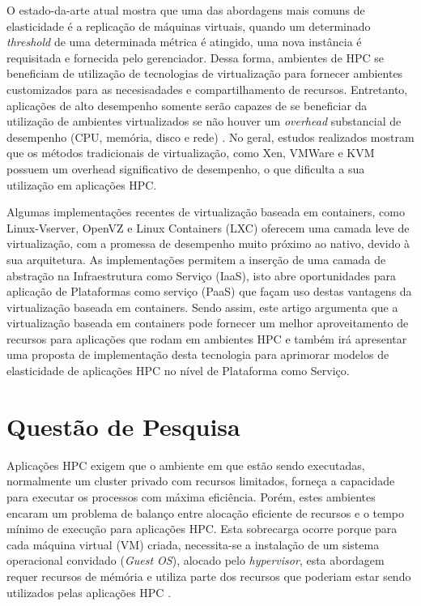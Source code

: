\documentclass[twoside,english,brazilian]{UNISINOSmonografia}
\begin{document}
O estado-da-arte atual mostra que uma das abordagens mais comuns de elasticidade é a replicação de máquinas virtuais, quando um determinado \textit{threshold} de uma determinada métrica é atingido, uma nova instância é requisitada e fornecida pelo gerenciador. Dessa forma, ambientes de HPC se beneficiam de utilização de tecnologias de virtualização para fornecer ambientes customizados para as necesisadades e compartilhamento de recursos. Entretanto, aplicações de alto desempenho somente serão capazes de se beneficiar da utilização de ambientes virtualizados se não houver um \textit{overhead} substancial de desempenho (CPU, memória, disco e rede) \cite{Xavier2013}. No geral, estudos realizados mostram que os métodos tradicionais de virtualização, como Xen, VMWare e KVM possuem um overhead significativo de desempenho, o que dificulta a sua utilização em aplicações HPC. 

Algumas implementações recentes de virtualização baseada em containers, como Linux-Vserver, OpenVZ e Linux Containers (LXC) oferecem uma camada leve de virtualização, com a promessa de desempenho muito próximo ao nativo, devido à sua arquitetura. As implementações permitem a inserção de uma camada de abstração na Infraestrutura como Serviço (IaaS), isto abre oportunidades para aplicação de Plataformas como serviço (PaaS) que façam uso destas vantagens da virtualização baseada em containers. Sendo assim, este artigo argumenta que a virtualização baseada em containers pode fornecer um melhor aproveitamento de recursos para aplicações que rodam em ambientes HPC e também irá apresentar uma proposta de implementação desta tecnologia para aprimorar modelos de elasticidade de aplicações HPC no nível de Plataforma como Serviço.



\section{Questão de Pesquisa}

Aplicações HPC exigem que o ambiente em que estão sendo executadas, normalmente um cluster privado com recursos limitados, forneça a capacidade para executar os processos com máxima eficiência. Porém, estes ambientes encaram um problema de balanço entre alocação eficiente de recursos e o tempo mínimo de execução para aplicações HPC. Esta sobrecarga ocorre porque para cada máquina virtual (VM) criada, necessita-se a instalação de um sistema operacional convidado (\textit{Guest OS}), alocado pelo \textit{hypervisor}, esta abordagem requer recursos de mémória e utiliza parte dos recursos que poderiam estar sendo utilizados pelas aplicações HPC \cite{Adufu2015}.
\end{document}
